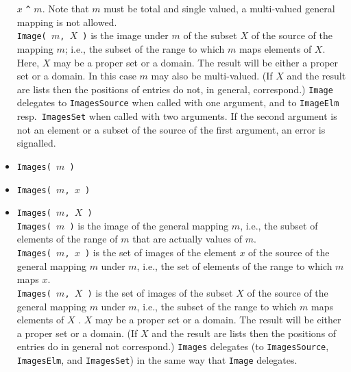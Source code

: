 \documentclass[11pt]{amsart}
\theoremstyle{plain}
\newcommand{\<}{\ensuremath{\langle}}
\renewcommand{\>}{\ensuremath{\rangle}}
\begin{document}
\begin{itemize}
$x$ \verb.^. $m$. 
Note that $m$ must be total and single valued, a multi-valued general mapping is not
allowed.
\\[4pt]
{\tt Image( $m$, $X$ )} is the image under $m$ of the subset $X$ of the source of
the mapping $m$; i.e., the
subset of the range to which $m$ maps elements of $X$. Here, $X$ may be a proper set
or a domain. 
The result will be either a proper set or a domain. In this case $m$ may also be
multi-valued. 
(If $X$ and the result are lists then the positions of entries do not, in general, correspond.)
{\tt Image} delegates to {\tt ImagesSource} when called with one argument, and to
{\tt ImageElm} resp.~{\tt ImagesSet} when called with two arguments.
If the second argument is not an element or a subset of the source of the first
argument, an error is signalled. 
\item {\tt Images( $m$ )}
\item {\tt Images( $m$, $x$ )}
\item {\tt Images( $m$, $X$ )}\\
{\tt Images( $m$ )} is the image of the general mapping $m$, i.e., the subset of elements of the range of $m$
that are actually values of $m$.
\\[4pt]
{\tt Images( $m$, $x$ )} is the set of images of the element $x$ of the source of the general mapping $m$
under $m$, i.e., the set of elements of the range to which $m$ maps $x$.
\\[4pt]
{\tt Images( $m$, $X$ )} is the set of images of the subset $X$ of the source of the general mapping $m$ under
$m$, i.e., the subset of the range to which $m$ maps elements of $X$ . $X$ may be a proper set or a domain.
The result will be either a proper set or a domain. (If $X$ and the result are lists then the positions of
entries do in general not correspond.)
{\tt Images} delegates (to {\tt ImagesSource}, {\tt ImagesElm}, and {\tt ImagesSet}) in the
same way that {\tt Image} delegates.
\end{itemize}

\newpage
\end{document}
